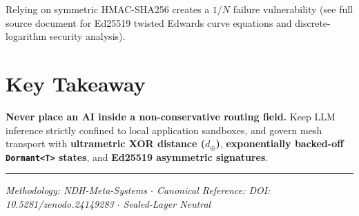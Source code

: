 \documentclass[11pt,a4paper]{article}
\begin{document}
Relying on symmetric HMAC-SHA256 creates a $1/N$ failure vulnerability (see full source document for Ed25519 twisted Edwards curve equations and discrete-logarithm security analysis).

\section*{Key Takeaway}

\textbf{Never place an AI inside a non-conservative routing field.} Keep LLM inference strictly confined to local application sandboxes, and govern mesh transport with \textbf{ultrametric XOR distance ($d_{\oplus}$)}, \textbf{exponentially backed-off \texttt{Dormant<T>} states}, and \textbf{Ed25519 asymmetric signatures}.

\vspace{1em}
\noindent\rule{\textwidth}{0.4pt}
\small\textit{Methodology: NDH-Meta-Systems $\cdot$ Canonical Reference: DOI: 10.5281/zenodo.24149283 $\cdot$ Sealed-Layer Neutral}
\end{document}
